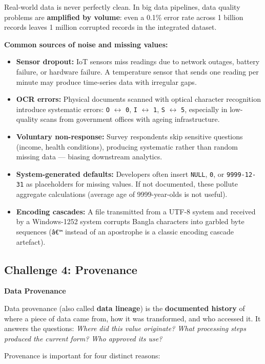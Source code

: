 \documentclass[12pt,a4paper]{article}
\newcommand{\defbox}[2]{%
  \noindent
  \colorbox{PUNavy!12}{%
    \begin{minipage}{\dimexpr\linewidth-2\fboxsep}
      \vspace{4pt}\textbf{\textcolor{PUNavy}{#1}}\par\vspace{2pt}
      #2\vspace{4pt}
    \end{minipage}%
  }\par\vspace{6pt}%
}
\begin{document}
Real-world data is never perfectly clean.  In big data pipelines, data quality problems are \textbf{amplified by volume}: even a 0.1\% error rate across 1 billion records leaves 1 million corrupted records in the integrated dataset.

\textbf{Common sources of noise and missing values:}
\begin{itemize}[leftmargin=1.8em]
  \item \textbf{Sensor dropout:} IoT sensors miss readings due to network outages, battery failure, or hardware failure.  A temperature sensor that sends one reading per minute may produce time-series data with irregular gaps.
  \item \textbf{OCR errors:} Physical documents scanned with optical character recognition introduce systematic errors: \texttt{O} $\leftrightarrow$ \texttt{0}, \texttt{I} $\leftrightarrow$ \texttt{1}, \texttt{S} $\leftrightarrow$ \texttt{5}, especially in low-quality scans from government offices with ageing infrastructure.
  \item \textbf{Voluntary non-response:} Survey respondents skip sensitive questions (income, health conditions), producing systematic rather than random missing data --- biasing downstream analytics.
  \item \textbf{System-generated defaults:} Developers often insert \texttt{NULL}, \texttt{0}, or \texttt{9999-12-31} as placeholders for missing values.  If not documented, these pollute aggregate calculations (average age of 9999-year-olds is not useful).
  \item \textbf{Encoding cascades:} A file transmitted from a UTF-8 system and received by a Windows-1252 system corrupts Bangla characters into garbled byte sequences (\texttt{â€™} instead of an apostrophe is a classic encoding cascade artefact).
\end{itemize}

\subsection{Challenge 4: Provenance}

\defbox{Data Provenance}{Data provenance (also called \textbf{data lineage}) is the \textbf{documented history} of where a piece of data came from, how it was transformed, and who accessed it.  It answers the questions: \textit{Where did this value originate?  What processing steps produced the current form?  Who approved its use?}}

Provenance is important for four distinct reasons:
\end{document}
